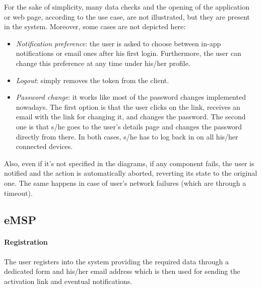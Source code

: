 For the sake of simplicity, many data checks and the opening of the application or web page, according to the use case, are not illustrated, but they are present in the system. Moreover, some cases are not depicted here:
\begin{itemize}
    \item \textit{Notification preference}: the user is asked to choose between in-app notifications or email ones after his first login. Furthermore, the user can change this preference at any time under his/her profile.
    \item \textit{Logout}: simply removes the token from the client.
    \item \textit{Password change}: it works like most of the password changes implemented nowadays. The first option is that the user clicks on the  link, receives an email with the link for changing it, and changes the password. The second one is that s/he goes to the user's details page and changes the password directly from there. In both cases, s/he has to log back in on all his/her connected devices.
\end{itemize}
Also, even if it's not specified in the diagrams, if any component fails, the user is notified and the action is automatically aborted, reverting its state to the original one. The same happens in case of user's network failures (which are  through a timeout).

\subsection{eMSP}

\paragraph{Registration} The user registers into the system providing the required data through a dedicated form and his/her email address which is then used for sending the activation link and eventual notifications.


